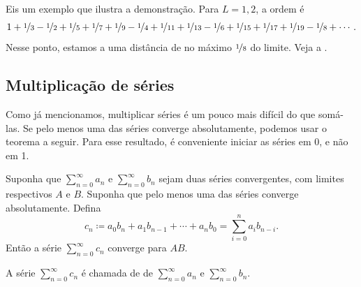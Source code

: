 \begin{example}
Eis um exemplo que ilustra a demonstração. Para $L=1{,}2$, a ordem
é
\begin{equation*}
1+\nicefrac{1}{3}-\nicefrac{1}{2}+\nicefrac{1}{5}+\nicefrac{1}{7}+\nicefrac{1}{9}-\nicefrac{1}{4}+\nicefrac{1}{11}+\nicefrac{1}{13}-\nicefrac{1}{6}
+\nicefrac{1}{15}+\nicefrac{1}{17}+\nicefrac{1}{19} - \nicefrac{1}{8} + \cdots .
\end{equation*}
Nesse ponto, estamos a uma distância de no máximo $\nicefrac{1}{8}$ do limite.
Veja a .
\begin{myfigureht}
\caption{As primeiras 14 somas parciais da reordenação que converge
para $1{,}2$.\label{fig:serrearrange}}
\end{myfigureht}
\end{example}

\subsection{Multiplicação de séries}

Como já mencionamos,
multiplicar séries é um pouco mais difícil do que somá-las.
Se pelo menos uma das séries converge
absolutamente, podemos usar o teorema a seguir. Para esse resultado, é
conveniente iniciar as séries em 0, e não em 1.

\begin{thm}
Suponha que $\sum_{n=0}^\infty a_n$ e $\sum_{n=0}^\infty b_n$ sejam duas séries convergentes, com limites
respectivos $A$ e $B$. Suponha que pelo menos uma das séries
converge absolutamente. Defina
\begin{equation*}
c_n \coloneqq a_0 b_n + a_1 b_{n-1} + \cdots + a_n b_0 = \sum_{i=0}^n a_i b_{n-i} .
\end{equation*}
Então a série $\sum_{n=0}^\infty c_n$
converge para $AB$.
\end{thm}

A série $\sum_{n=0}^\infty c_n$ é chamada de \emph{} de
$\sum_{n=0}^\infty a_n$ e $\sum_{n=0}^\infty b_n$.

